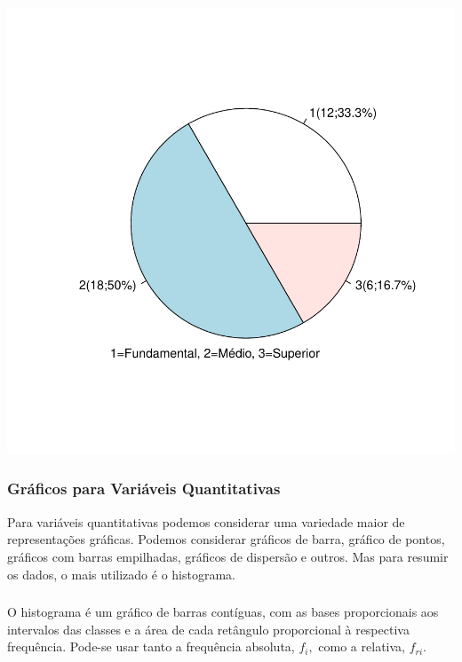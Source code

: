 \documentclass[14pt,aspectratio=1610]{beamer}
\begin{document}
\begin{frame}{}
\frametitle{}
\begin{block}{}

\begin{center}
\includegraphics{Aula1-pizza}
\end{center}
\end{block}
\end{frame}

\begin{frame}{}
\frametitle{Gráficos para Variáveis Quantitativas}
\begin{block}{}
\justifying
Para variáveis quantitativas podemos considerar uma variedade maior de representações
gráficas. Podemos considerar gráficos de barra, gráfico de pontos, gráficos com barras 
empilhadas, gráficos de dispersão e outros. Mas para resumir os dados, o mais utilizado 
é o histograma.
\end{block}
\end{frame}

\begin{frame}{}
\frametitle{}
\begin{block}{}
\justifying
O histograma é um gráfico de barras contíguas, com as bases proporcionais aos intervalos
das classes e a área de cada retângulo proporcional à respectiva frequência. Pode-se
usar tanto a frequência absoluta, $f_{i},$ como a relativa, $f_{ri}.$
\end{block}
\end{frame}
\end{document}
